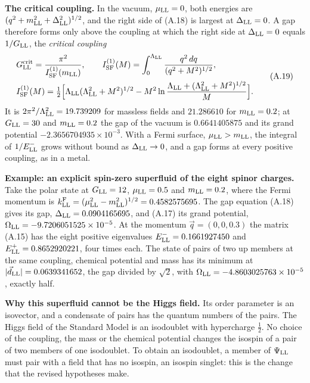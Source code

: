 \documentclass[
  10pt,
]{article}
\begin{document}
\textbf{The critical coupling.} In the vacuum, \(\mu_{\rm LL}=0\), both
energies are \((q^2+m_{\rm LL}^2+\Delta_{\rm LL}^2)^{1/2}\), and the
right side of (A.18) is largest at \(\Delta_{\rm LL}=0\). A gap
therefore forms only above the coupling at which the right side at
\(\Delta_{\rm LL}=0\) equals \(1/G_{\rm LL}\), the \emph{critical
coupling}
\[\begin{aligned}&G^{\rm crit}_{\rm LL}=\frac{\pi^2}{I^{(1)}_{\rm SF}(m_{\rm LL})},\qquad I^{(1)}_{\rm SF}(M)=\int_0^{\Lambda_{\rm LL}}\frac{q^2\,dq}{(q^2+M^2)^{1/2}},\\&I^{(1)}_{\rm SF}(M)=\tfrac12\Big[\Lambda_{\rm LL}(\Lambda_{\rm LL}^2+M^2)^{1/2}-M^2\ln\frac{\Lambda_{\rm LL}+(\Lambda_{\rm LL}^2+M^2)^{1/2}}{M}\Big].\end{aligned}\tag{A.19}\]
It is \(2\pi^2/\Lambda_{\rm LL}^2=19.739209\) for massless fields and
\(21.286610\) for \(m_{\rm LL}=0.2\); at \(G_{\rm LL}=30\) and
\(m_{\rm LL}=0.2\) the gap of the vacuum is \(0.6641405875\) and its
grand potential \(-2.3656704935\times10^{-3}\). With a Fermi surface,
\(\mu_{\rm LL}>m_{\rm LL}\), the integral of \(1/E^-_{\rm LL}\) grows
without bound as \(\Delta_{\rm LL}\to0\), and a gap forms at every
positive coupling, as in a metal.

\textbf{Example: an explicit spin-zero superfluid of the eight spinor
charges.} Take the polar state at \(G_{\rm LL}=12\),
\(\mu_{\rm LL}=0.5\) and \(m_{\rm LL}=0.2\), where the Fermi momentum is
\(k^{\rm F}_{\rm LL}=(\mu_{\rm LL}^2-m_{\rm LL}^2)^{1/2}=0.4582575695\).
The gap equation (A.18) gives its gap, \(\Delta_{\rm LL}=0.0904165695\),
and (A.17) its grand potential,
\(\Omega_{\rm LL}=-9.7206051525\times10^{-5}\). At the momentum
\(\vec q=(0,0,0.3)\) the matrix (A.15) has the eight positive
eigenvalues \(E^-_{\rm LL}=0.1661927450\) and
\(E^+_{\rm LL}=0.8652920221\), four times each. The state of pairs of
two up members at the same coupling, chemical potential and mass has its
minimum at \(|\vec d_{\rm LL}|=0.0639341652\), the gap divided by
\(\sqrt2\), with \(\Omega_{\rm LL}=-4.8603025763\times10^{-5}\), exactly
half.

\textbf{Why this superfluid cannot be the Higgs field.} Its order
parameter is an isovector, and a condensate of pairs has the quantum
numbers of the pairs. The Higgs field of the Standard Model is an
isodoublet with hypercharge \(\tfrac12\). No choice of the coupling, the
mass or the chemical potential changes the isospin of a pair of two
members of one isodoublet. To obtain an isodoublet, a member of
\(\Psi_{\rm LL}\) must pair with a field that has no isospin, an isospin
singlet: this is the change that the revised hypotheses make.
\end{document}

